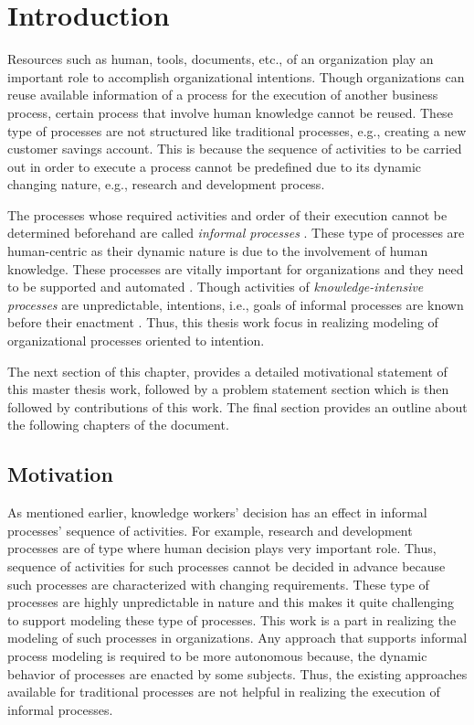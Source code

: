 \chapter{Introduction}
\label{chap:introduction}

Resources such as human, tools, documents, etc., of an organization play an important role to accomplish organizational intentions. Though organizations can reuse available information of a process for the execution of another business process, certain process that involve human knowledge cannot be reused. These type of processes are not structured like traditional processes, e.g., creating a new customer savings account. This is because the sequence of activities to be carried out in order to execute a process cannot be predefined due to its dynamic changing nature, e.g., research and development process.

The processes whose required activities and order of their execution cannot be determined beforehand are called \textit{informal processes} \cite{Sungur2014}. These type of processes are human-centric as their dynamic nature is due to the involvement of human knowledge. These processes are vitally important for organizations and they need to be supported and automated \cite{Sungur2014a}. Though activities of \textit{knowledge-intensive processes} are unpredictable, intentions, i.e., goals of informal processes are known before their enactment \cite{DiCiccio2015}. Thus, this thesis work focus in realizing modeling of organizational processes oriented to intention. 

The next section of this chapter, provides a detailed motivational statement of this master thesis work, followed by a problem statement section which is then followed by contributions of this work. The final section provides an outline about the following chapters of the document. 

\section{Motivation}
\label{sec:motivation}
As mentioned earlier, knowledge workers' decision has an effect in informal processes' sequence of activities. For example, research and development processes are of type where human decision plays very important role. Thus, sequence of activities for such processes cannot be decided in advance because such processes are characterized with changing requirements. These type of processes are highly unpredictable in nature and this makes it quite challenging to support modeling these type of processes. This work is a part in realizing the modeling of such processes in organizations. Any approach that supports informal process modeling is required to be more autonomous because, the dynamic behavior of processes are enacted by some subjects. Thus, the existing approaches available for traditional processes are not helpful in realizing the execution of informal processes.  

